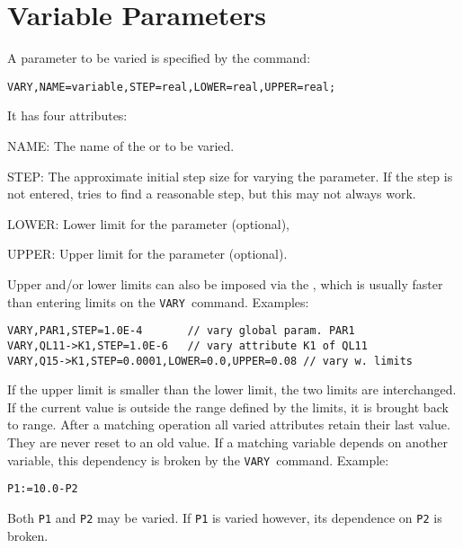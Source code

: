 \section{Variable Parameters}
\label{sec:vary}
A parameter to be varied is specified by the command:
\begin{verbatim}
VARY,NAME=variable,STEP=real,LOWER=real,UPPER=real;
\end{verbatim}
It has four attributes:
\begin{description}
\item{NAME:}
  The name of the  or
   to be varied.
\item{STEP:}
  The approximate initial step size for varying the parameter.
  If the step is not entered, \opal tries to find a reasonable step,
  but this may not always work.
\item{LOWER:}
  Lower limit for the parameter (optional),
\item{UPPER:}
  Upper limit for the parameter (optional).
\end{description}
Upper and/or lower limits can also be imposed via the
,
which is usually faster than entering limits on the
\texttt{VARY}~command. 
Examples:
\begin{verbatim}
VARY,PAR1,STEP=1.0E-4       // vary global param. PAR1 
VARY,QL11->K1,STEP=1.0E-6   // vary attribute K1 of QL11 
VARY,Q15->K1,STEP=0.0001,LOWER=0.0,UPPER=0.08 // vary w. limits
\end{verbatim}
If the upper limit is smaller than the lower limit,
the two limits are interchanged.
If the current value is outside the range defined by the limits,
it is brought back to range.
After a matching operation all varied attributes retain their last value.
They are never reset to an old value.
If a matching variable depends on another variable,
this dependency is broken by the \texttt{VARY}~command.
Example:
\begin{verbatim}
P1:=10.0-P2
\end{verbatim}
Both \texttt{P1} and \texttt{P2} may be varied.
If \texttt{P1} is varied however, its dependence on \texttt{P2} is broken.

 
